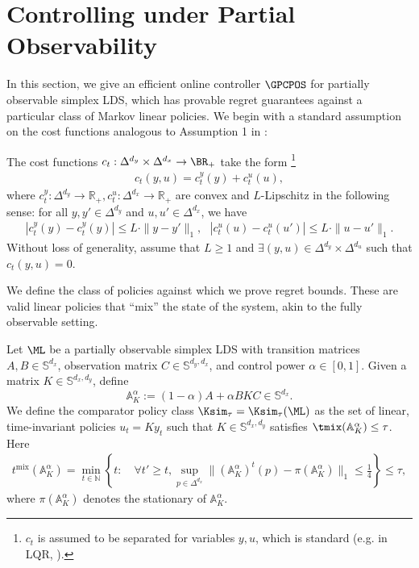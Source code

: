 \section{Controlling under Partial Observability}
\label{sec:po-prelim-and-approx}

In this section, we give an efficient online controller $\GPCPOS$ for partially observable simplex LDS, which has provable regret guarantees against a particular class of Markov linear policies. 
We begin with a standard assumption on the cost functions analogous to Assumption 1 in \citep{golowich2024online}:

\begin{assumption}
\label{asm:po-convex-loss}
The cost functions $c_t:\Delta^{d_y}\times \Delta^{d_x} \to \BR_+$ take the form \footnote{$c_t$ is assumed to be separated for variables $y,u$, which is standard (e.g. in LQR, \citep{simchowitz2020naive}).} 
\begin{align*}
c_t(y,u)=c_t^y(y)+c_t^u(u),
\end{align*}
where $c_t^y:\Delta^{d_y}\rightarrow\mathbb{R}_+, c_t^u:\Delta^{d_x}\rightarrow\mathbb{R}_+$ are convex and $L$-Lipschitz in the following sense: for all $y,y'\in\Delta^{d_y}$ and $u,u'\in\Delta^{d_x}$, we have
\begin{align*}
|c_t^y(y)-c_t^y(y)|\le L\cdot \|y-y'\|_1, \ \ \ |c_t^u(u)-c_t^u(u')|\le L\cdot \|u-u'\|_1.
\end{align*}
Without loss of generality, assume that $L\ge 1$ and $\exists (y,u)\in\Delta^{d_y}\times\Delta^{d_u}$ such that $c_t(y,u)=0$. 
\end{assumption}

We define the class of policies against which we prove regret bounds. These are valid linear policies that “mix” the state of the system, akin to the fully observable setting.

\begin{definition} 
\label{def:po-comparator}
Let $\ML$ be a partially observable simplex LDS with transition matrices $A,B \in \mathbb{S}^{d_x}$, observation matrix $C \in \mathbb{S}^{d_y, d_x}$, and control power $\alpha \in [0,1]$. Given a matrix $K\in\mathbb{S}^{d_x, d_y}$, define \[\mathbb{A}_K^{\alpha}:=(1-\alpha)A+\alpha BKC\in\mathbb{S}^{d_x}.\]
We define the comparator policy class $\Ksim_\tau = \Ksim_\tau(\ML)$ as the set of linear, time-invariant policies $u_t=K y_t$ such that $K\in\mathbb{S}^{d_x,d_y}$ satisfies $\tmix(\mathbb{A}_{K}^{\alpha})\le \tau$. Here
\begin{align*}
t^{\mathrm{mix}}(\mathbb{A}_{K}^{\alpha})=\min_{t\in\mathbb{N}}\left\{t: \quad \forall t'\ge t, \sup_{p\in\Delta^{d_x}}\|(\mathbb{A}_{K}^{\alpha})^t(p)-\pi(\mathbb{A}_{K}^{\alpha})\|_1\le \frac{1}{4}\right\}\le \tau,
\end{align*}
where $\pi(\mathbb{A}_{K}^{\alpha})$ denotes the stationary of $\mathbb{A}_{K}^{\alpha}$.
\end{definition}

